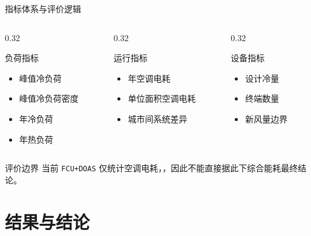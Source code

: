 \documentclass{beamer}
\begin{document}
\begin{frame}{指标体系与评价逻辑}
\small
\begin{columns}[T]
    \begin{column}{0.32\textwidth}
        \begin{block}{负荷指标}
            \begin{itemize}
                \item 峰值冷负荷
                \item 峰值冷负荷密度
                \item 年冷负荷
                \item 年热负荷
            \end{itemize}
        \end{block}
    \end{column}
    \begin{column}{0.32\textwidth}
        \begin{block}{运行指标}
            \begin{itemize}
                \item 年空调电耗
                \item 单位面积空调电耗
                \item 城市间系统差异
            \end{itemize}
        \end{block}
    \end{column}
    \begin{column}{0.32\textwidth}
        \begin{block}{设备指标}
            \begin{itemize}
                \item 设计冷量
                \item 终端数量
                \item 新风量边界
            \end{itemize}
        \end{block}
    \end{column}
\end{columns}

\vspace{0.4em}
\begin{alertblock}{评价边界}
当前 \texttt{FCU+DOAS} 仅统计空调电耗，，因此不能直接据此下综合能耗最终结论。
\end{alertblock}
\end{frame}

\section{结果与结论}
\end{document}
